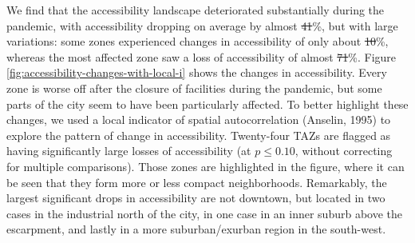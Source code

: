 \documentclass[]{elsarticle} %
\providecommand{\DIFaddtex}[1]{{\protect\color{blue}\uwave{#1}}} %
\providecommand{\DIFdeltex}[1]{{\protect\color{red}\sout{#1}}}                      %
\providecommand{\DIFaddbegin}{} %
\providecommand{\DIFaddend}{} %
\providecommand{\DIFdelbegin}{} %
\providecommand{\DIFdelend}{} %
\providecommand{\DIFadd}[1]{\texorpdfstring{\DIFaddtex{#1}}{#1}} %
\providecommand{\DIFdel}[1]{\texorpdfstring{\DIFdeltex{#1}}{}} %
\newcommand{\DIFscaledelfig}{0.5}
\newlength{\DIFdelgraphicswidth} %
\newlength{\DIFdelgraphicsheight} %
\newcommand{\DIFaddincludegraphics}[2][]{{\color{blue}\fbox{\DIFOincludegraphics[#1]{#2}}}} %
\newcommand{\DIFdelincludegraphics}[2][]{%
\sbox{\DIFdelgraphicsbox}{\DIFOincludegraphics[#1]{#2}}%
\settoboxwidth{\DIFdelgraphicswidth}{\DIFdelgraphicsbox} %
\settoboxtotalheight{\DIFdelgraphicsheight}{\DIFdelgraphicsbox} %
\scalebox{\DIFscaledelfig}{%
\parbox[b]{\DIFdelgraphicswidth}{\usebox{\DIFdelgraphicsbox}\\[-\baselineskip] \rule{\DIFdelgraphicswidth}{0em}}\llap{\resizebox{\DIFdelgraphicswidth}{\DIFdelgraphicsheight}{%
\setlength{\unitlength}{\DIFdelgraphicswidth}%
\begin{picture}(1,1)%
\thicklines\linethickness{2pt} %
{\color[rgb]{1,0,0}\put(0,0){\framebox(1,1){}}}%
{\color[rgb]{1,0,0}\put(0,0){\line( 1,1){1}}}%
{\color[rgb]{1,0,0}\put(0,1){\line(1,-1){1}}}%
\end{picture}%
}\hspace*{3pt}}} %
} %
\DeclareRobustCommand{\DIFaddbegin}{\DIFOaddbegin \let\includegraphics\DIFaddincludegraphics} %
\DeclareRobustCommand{\DIFaddend}{\DIFOaddend \let\includegraphics\DIFOincludegraphics} %
\DeclareRobustCommand{\DIFdelbegin}{\DIFOdelbegin \let\includegraphics\DIFdelincludegraphics} %
\DeclareRobustCommand{\DIFdelend}{\DIFOaddend \let\includegraphics\DIFOincludegraphics} %
\begin{document}
We find that the accessibility landscape deteriorated substantially
during the pandemic, with accessibility dropping on average by almost
\DIFdelbegin \DIFdel{41}\DIFdelend \DIFaddbegin \DIFadd{38}\DIFaddend \%, but with large variations: some zones experienced changes in
accessibility of only about \DIFdelbegin \DIFdel{10}\DIFdelend \DIFaddbegin \DIFadd{8}\DIFaddend \%, whereas the most affected zone saw a
loss of accessibility of almost \DIFdelbegin \DIFdel{71}\DIFdelend \DIFaddbegin \DIFadd{96}\DIFaddend \%. Figure
\ref{fig:accessibility-changes-with-local-i} shows the changes in
accessibility. Every zone is worse off after the closure of facilities
during the pandemic, but some parts of the city seem to have been
particularly affected. To better highlight these changes, we used a
local indicator of spatial autocorrelation (Anselin, 1995) to explore
the pattern of change in accessibility. Twenty-four TAZs are flagged as
having significantly large losses of accessibility (at \(p\le 0.10\),
without correcting for multiple comparisons). Those zones are
highlighted in the figure, where it can be seen that they form more or
less compact neighborhoods. Remarkably, the largest significant drops in
accessibility are not downtown, but located in two cases in the
industrial north of the city, in one case in an inner suburb above the
escarpment, and lastly in a more suburban/exurban region in the
south-west.
\end{document}
